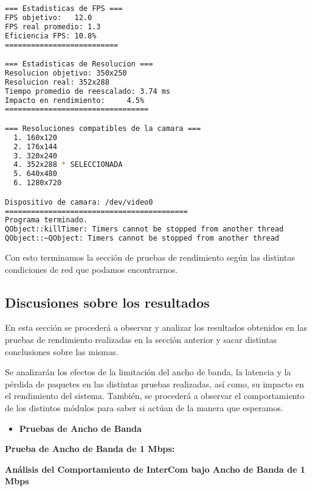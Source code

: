 \begin{adjustbox}{max width=\textwidth}
\begin{lstlisting}[language=bash,basicstyle=\ttfamily\scriptsize]
=== Estadisticas de FPS ===
FPS objetivo: 	12.0
FPS real promedio: 1.3
Eficiencia FPS:	10.8%
==========================

=== Estadisticas de Resolucion ===
Resolucion objetivo: 350x250
Resolucion real: 352x288
Tiempo promedio de reescalado: 3.74 ms
Impacto en rendimiento:    	4.5%
=================================

=== Resoluciones compatibles de la camara ===
  1. 160x120
  2. 176x144
  3. 320x240
  4. 352x288 * SELECCIONADA
  5. 640x480
  6. 1280x720

Dispositivo de camara: /dev/video0
==========================================
Programa terminado.
QObject::killTimer: Timers cannot be stopped from another thread
QObject::~QObject: Timers cannot be stopped from another thread
\end{lstlisting}
\end{adjustbox}
\vspace{\baselineskip}

Con esto terminamos la sección de pruebas de rendimiento según las distintas condiciones de red que podamos encontrarnos.  

\subsection{Discusiones sobre los resultados}

En esta sección se procederá a observar y analizar los resultados obtenidos en las pruebas de rendimiento realizadas en la sección anterior y sacar distintas conclusiones sobre las mismas. 
\vspace{\baselineskip}

Se analizarán los efectos de la limitación del ancho de banda, la latencia y la pérdida de paquetes en las distintas pruebas realizadas, así como, su impacto en el rendimiento del sistema. También, se procederá a observar el comportamiento de los distintos módulos para saber si actúan de la manera que esperamos.

\begin{itemize}
  \item \textbf{Pruebas de Ancho de Banda}
\end{itemize}

\textbf{Prueba de Ancho de Banda de 1 Mbps:}

\begin{center}
    \Large \textbf{Análisis del Comportamiento de InterCom bajo Ancho de Banda de 1 Mbps}
\end{center}
\vspace{\baselineskip}

